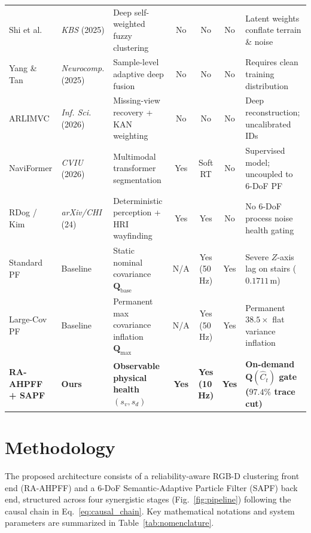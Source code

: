 \documentclass[11pt, a4paper]{article}
\begin{document}
\begin{table}[htbp]
\begin{tabularx}{\textwidth}{l l >{\raggedright\arraybackslash}X c c c >{\raggedright\arraybackslash}X}
        Shi et al. \cite{shi2025deep} & \textit{KBS} (2025) & Deep self-weighted fuzzy clustering & No & No & No & Latent weights conflate terrain \& noise \\
        Yang \& Tan \cite{yang2025deep} & \textit{Neurocomp.} (2025) & Sample-level adaptive deep fusion & No & No & No & Requires clean training distribution \\
        ARLIMVC \cite{he2026adaptive} & \textit{Inf. Sci.} (2026) & Missing-view recovery + KAN weighting & No & No & No & Deep reconstruction; uncalibrated IDs \\
        NaviFormer \cite{bui2026naviformer} & \textit{CVIU} (2026) & Multimodal transformer segmentation & Yes & Soft RT & No & Supervised model; uncoupled to 6-DoF PF \\
        RDog / Kim \cite{kim2023transforming, cai2024navigating} & \textit{arXiv/CHI} (24) & Deterministic perception + HRI wayfinding & Yes & Yes & No & No 6-DoF process noise health gating \\
        Standard PF \cite{thrun2005probabilistic} & Baseline & Static nominal covariance $\mathbf{Q}_{\text{base}}$ & N/A & Yes (50\,Hz) & Yes & Severe $Z$-axis lag on stairs ($0.1711$\,m) \\
        Large-Cov PF & Baseline & Permanent max covariance inflation $\mathbf{Q}_{\max}$ & N/A & Yes (50\,Hz) & Yes & Permanent $38.5\times$ flat variance inflation \\
        \midrule
        \textbf{RA-AHPFF + SAPF} & \textbf{Ours} & \textbf{Observable physical health $(s_v, s_d)$} & \textbf{Yes} & \textbf{Yes (10\,Hz)} & \textbf{Yes} & \textbf{On-demand $\mathbf{Q}(\hat{C}_t)$ gate ($97.4\%$ trace cut)} \\
        \bottomrule
    \end{tabularx}
\end{table}

\section{Methodology}
\label{sec:methodology}

The proposed architecture consists of a reliability-aware RGB-D clustering front end (RA-AHPFF) and a 6-DoF Semantic-Adaptive Particle Filter (SAPF) back end, structured across four synergistic stages (Fig.~\ref{fig:pipeline}) following the causal chain in Eq.~\eqref{eq:causal_chain}. Key mathematical notations and system parameters are summarized in Table~\ref{tab:nomenclature}.
\end{document}
